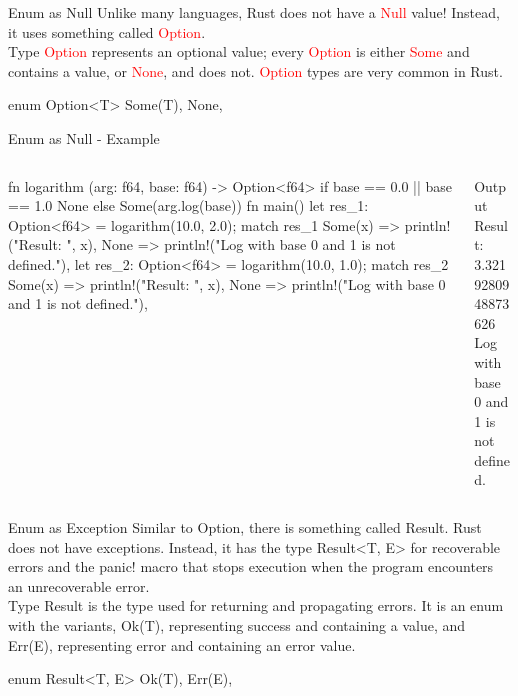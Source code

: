 \documentclass[10pt,xcolor={dvipsnames}, aspectratio=169]{beamer}
\begin{document}
	\begin{frame}[fragile]{Enum as Null}
	    Unlike many languages, Rust does not have a \textcolor{red}{Null} value! Instead, it uses something called \textcolor{red}{Option}. \\
	    Type \textcolor{red}{Option} represents an optional value; every \textcolor{red}{Option} is either \textcolor{red}{Some} and contains a value, or \textcolor{red}{None}, and does not. \textcolor{red}{Option} types are very common in Rust. \\
	    \begin{rustcode}
enum Option<T> {
   Some(T),
   None,
}
        \end{rustcode}
	\end{frame}
	\begin{frame}[fragile]{Enum as Null - Example}
	    \begin{columns}
	    \begin{column}{0.6 \textwidth}
            \begin{rustcode}
fn logarithm (arg: f64, base: f64) -> Option<f64> {
    if base == 0.0 || base == 1.0 { None }
    else { Some(arg.log(base)) }
}
fn main() {
    let res_1: Option<f64> = logarithm(10.0, 2.0);
    match res_1 {
        Some(x) => println!("Result: {}", x),
        None => println!("Log with base 0 and 1 is not defined."),
    }
    let res_2: Option<f64> = logarithm(10.0, 1.0);
    match res_2 {
        Some(x) => println!("Result: {}", x),
        None => println!("Log with base 0 and 1 is not defined."),
    }
}
        \end{rustcode}
    \end{column}
	\begin{column}{0.4 \textwidth}
		\vspace{-3cm}
		\begin{block}{Output}
		Result: 3.3219280948873626 \\
        Log with base 0 and 1 is not defined.
		\end{block}
	\end{column}
    \end{columns}
    \end{frame}
\begin{frame}[fragile]{Enum as Exception}
	    Similar to Option, there is something called Result. Rust does not have exceptions. Instead, it has the type Result<T, E> for recoverable errors and the panic! macro that stops execution when the program encounters an unrecoverable error. \\
	    Type Result is the type used for returning and propagating errors. It is an enum with the variants, Ok(T), representing success and containing a value, and Err(E), representing error and containing an error value.
	    \begin{rustcode}
enum Result<T, E> {
   Ok(T),
   Err(E),
}
        \end{rustcode}
	\end{frame}
\end{document}
